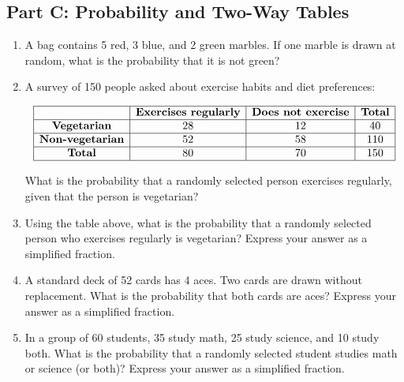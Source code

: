 \documentclass[14pt]{extarticle}
\begin{document}
\subsection*{Part C: Probability and Two-Way Tables}
\begin{enumerate}
  \item A bag contains 5 red, 3 blue, and 2 green marbles. If one marble is drawn at random, what is the probability that it is not green?

  \item A survey of 150 people asked about exercise habits and diet preferences:

  \[
  \begin{array}{|c|c|c|c|}
  \hline
   & \textbf{Exercises regularly} & \textbf{Does not exercise} & \textbf{Total} \\
  \hline
  \textbf{Vegetarian} & 28 & 12 & 40 \\
  \hline
  \textbf{Non-vegetarian} & 52 & 58 & 110 \\
  \hline
  \textbf{Total} & 80 & 70 & 150 \\
  \hline
  \end{array}
  \]

  What is the probability that a randomly selected person exercises regularly, given that the person is vegetarian?

  \item Using the table above, what is the probability that a randomly selected person who exercises regularly is vegetarian? Express your answer as a simplified fraction.

  \item A standard deck of 52 cards has 4 aces. Two cards are drawn without replacement. What is the probability that both cards are aces? Express your answer as a simplified fraction.

  \item In a group of 60 students, 35 study math, 25 study science, and 10 study both. What is the probability that a randomly selected student studies math or science (or both)? Express your answer as a simplified fraction.
\end{enumerate}
\end{document}
